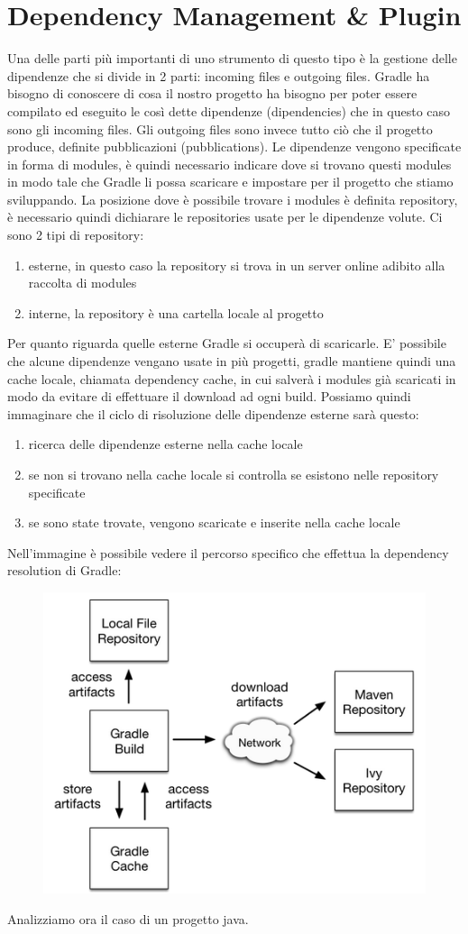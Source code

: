 \section{Dependency Management \& Plugin}
Una delle parti più importanti di uno strumento di questo tipo è la gestione delle dipendenze che si divide in 2 parti: incoming files e outgoing files. Gradle ha bisogno di conoscere di cosa il nostro progetto ha bisogno per poter essere compilato ed eseguito le così dette dipendenze (dipendencies) che in questo caso sono gli incoming files. Gli outgoing files sono invece tutto ciò che il progetto produce, definite pubblicazioni (pubblications). Le dipendenze vengono specificate in forma di modules, è quindi necessario indicare dove si trovano questi modules in modo tale che Gradle li possa scaricare e impostare per il progetto che stiamo sviluppando. La posizione dove è possibile trovare i modules è definita repository, è necessario quindi dichiarare le repositories usate per le dipendenze volute. Ci sono 2 tipi di repository: 
\begin{enumerate}
    \item esterne, in questo caso la repository si trova in un server online adibito alla raccolta di modules
    \item interne, la repository è una cartella locale al progetto
\end{enumerate}
Per quanto riguarda quelle esterne Gradle si occuperà di scaricarle. E' possibile che alcune dipendenze vengano usate in più progetti, gradle mantiene quindi una cache locale, chiamata dependency cache, in cui salverà i modules già scaricati in modo da evitare di effettuare il download ad ogni build. Possiamo quindi immaginare che il ciclo di risoluzione delle dipendenze esterne sarà questo:
\begin{enumerate}
    \item ricerca delle dipendenze esterne nella cache locale
    \item se non si trovano nella cache locale si controlla se esistono nelle repository specificate
    \item se sono state trovate, vengono scaricate e inserite nella cache locale
\end{enumerate}
Nell'immagine è possibile vedere il percorso specifico che effettua la dependency resolution di Gradle:
\begin{figure}[H]
\centering
\includegraphics[width=0.4\linewidth]{3DependencyManagement/depMan.png}
\end{figure}
Analizziamo ora il caso di un progetto java.



